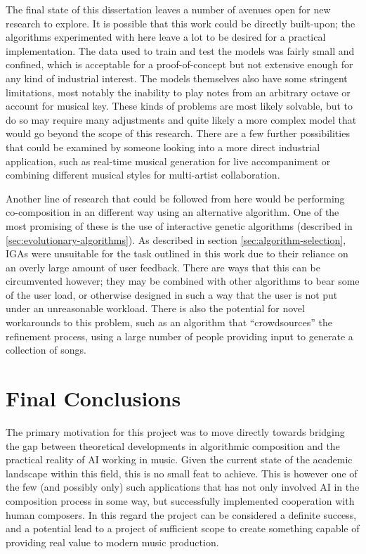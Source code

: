 \documentclass[ author={Stephen Livermore-Tozer},
				supervisor={Dr. Peter Flach},
				degree={MEng},
				title={Algorithmic Co-composition Using Machine Learning},
				subtitle={},
				type={research},
				year={2016} ]{dissertation}
\begin{document}
	The final state of this dissertation leaves a number of avenues open for new research to explore. It is possible that this work could be directly built-upon; the algorithms experimented with here leave a lot to be desired for a practical implementation. The data used to train and test the models was fairly small and confined, which is acceptable for a proof-of-concept but not extensive enough for any kind of industrial interest. The models themselves also have some stringent limitations, most notably the inability to play notes from an arbitrary octave or account for musical key. These kinds of problems are most likely solvable, but to do so may require many adjustments and quite likely a more complex model that would go beyond the scope of this research. There are a few further possibilities that could be examined by someone looking into a more direct industrial application, such as real-time musical generation for live accompaniment or combining different musical styles for multi-artist collaboration.
	
	Another line of research that could be followed from here would be performing co-composition in an different way using an alternative algorithm. One of the most promising of these is the use of interactive genetic algorithms (described in \ref{sec:evolutionary-algorithms}). As described in section \ref{sec:algorithm-selection}, IGAs were unsuitable for the task outlined in this work due to their reliance on an overly large amount of user feedback. There are ways that this can be circumvented however; they may be combined with other algorithms to bear some of the user load, or otherwise designed in such a way that the user is not put under an unreasonable workload. There is also the potential for novel workarounds to this problem, such as an algorithm that ``crowdsources'' the refinement process, using a large number of people providing input to generate a collection of songs.  
	
	\section{Final Conclusions}
	
	The primary motivation for this project was to move directly towards bridging the gap between theoretical developments in algorithmic composition and the practical reality of AI working in music. Given the current state of the academic landscape within this field, this is no small feat to achieve. This is however one of the few (and possibly only) such applications that has not only involved AI in the composition process in some way, but successfully implemented cooperation with human composers. In this regard the project can be considered a definite success, and a potential lead to a project of sufficient scope to create something capable of providing real value to modern music production.


	\backmatter
	
	
	
\end{document}

